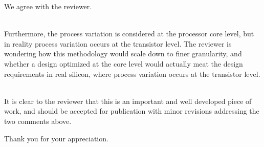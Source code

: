 \begin{authors}
We agree with the reviewer.

\begin{actions}
\end{actions}
\end{authors}

\begin{reviewer}
\\
Furthermore, the process variation is considered at the processor core level,
but in reality process variation occurs at the transistor level. The reviewer
is wondering how this methodology would scale down to finer granularity, and
whether a design optimized at the core level would actually meat the design
requirements in real silicon, where process variation occurs at the transistor
level.
\end{reviewer}

\begin{authors}
\begin{actions}
\end{actions}
\end{authors}

\begin{reviewer}
\\
It is clear to the reviewer that this is an important and well developed
piece of work, and should be accepted for publication with minor revisions
addressing the two comments above.
\end{reviewer}

\begin{authors}
  Thank you for your appreciation.
\end{authors}
